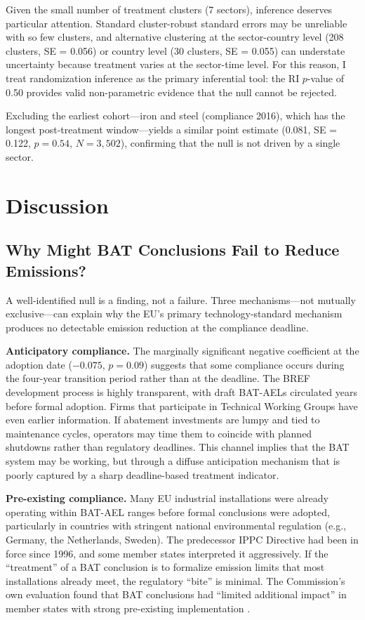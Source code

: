 \documentclass[12pt]{article}
\begin{document}
Given the small number of treatment clusters (7 sectors), inference deserves particular attention. Standard cluster-robust standard errors may be unreliable with so few clusters, and alternative clustering at the sector-country level (208 clusters, SE = 0.056) or country level (30 clusters, SE = 0.055) can understate uncertainty because treatment varies at the sector-time level. For this reason, I treat randomization inference as the primary inferential tool: the RI $p$-value of 0.50 provides valid non-parametric evidence that the null cannot be rejected.

Excluding the earliest cohort---iron and steel (compliance 2016), which has the longest post-treatment window---yields a similar point estimate (0.081, SE = 0.122, $p = 0.54$, $N = 3{,}502$), confirming that the null is not driven by a single sector.


\section{Discussion}

\subsection{Why Might BAT Conclusions Fail to Reduce Emissions?}

A well-identified null is a finding, not a failure. Three mechanisms---not mutually exclusive---can explain why the EU's primary technology-standard mechanism produces no detectable emission reduction at the compliance deadline.

\textbf{Anticipatory compliance.} The marginally significant negative coefficient at the adoption date ($-0.075$, $p = 0.09$) suggests that some compliance occurs during the four-year transition period rather than at the deadline. The BREF development process is highly transparent, with draft BAT-AELs circulated years before formal adoption. Firms that participate in Technical Working Groups have even earlier information. If abatement investments are lumpy and tied to maintenance cycles, operators may time them to coincide with planned shutdowns rather than regulatory deadlines. This channel implies that the BAT system may be working, but through a diffuse anticipation mechanism that is poorly captured by a sharp deadline-based treatment indicator.

\textbf{Pre-existing compliance.} Many EU industrial installations were already operating within BAT-AEL ranges before formal conclusions were adopted, particularly in countries with stringent national environmental regulation (e.g., Germany, the Netherlands, Sweden). The predecessor IPPC Directive had been in force since 1996, and some member states interpreted it aggressively. If the ``treatment'' of a BAT conclusion is to formalize emission limits that most installations already meet, the regulatory ``bite'' is minimal. The Commission's own evaluation found that BAT conclusions had ``limited additional impact'' in member states with strong pre-existing implementation \citep{european_commission2020}.
\end{document}
